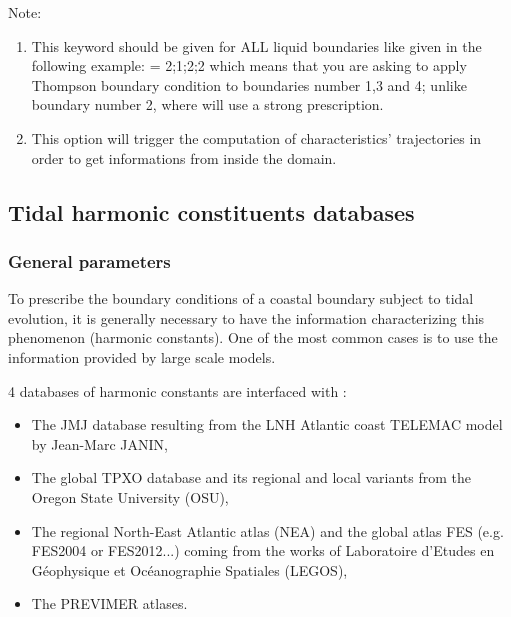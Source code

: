 \begin{WarningBlock}{Note:}
\begin{enumerate}
\item This keyword should be given for ALL liquid boundaries like given in the
following example: \newline
{}= 2;1;2;2 \newline
which means that you are asking  to apply Thompson boundary
condition to boundaries number 1,3 and 4;
unlike boundary number 2, where  will use a strong prescription.
\item This option will trigger the computation of characteristics' trajectories
in order to get informations from inside the domain.
\end{enumerate}
\end{WarningBlock}


\subsection{Tidal harmonic constituents databases}
\label{sec:tide}


\subsubsection{General parameters}

To prescribe the boundary conditions of a coastal boundary subject to tidal
evolution, it is generally necessary to have the information characterizing
this phenomenon (harmonic constants). One of the most common cases is to use
the information provided by large scale models.

4 databases of harmonic constants are interfaced with :

\begin{itemize}
\item The JMJ database resulting from the LNH Atlantic coast TELEMAC model
by Jean-Marc JANIN,

\item The global TPXO database and its regional and local variants from
the Oregon State University (OSU),

\item The regional North-East Atlantic atlas (NEA) and the global atlas
FES (e.g. FES2004 or FES2012...) coming from the works of Laboratoire
d'Etudes en Géophysique et Océanographie Spatiales (LEGOS),

\item The PREVIMER atlases.
\end{itemize}

